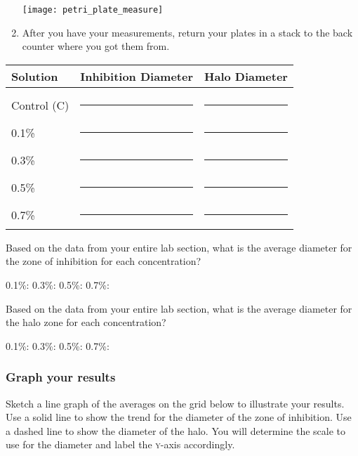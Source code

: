 \documentclass[12pt]{exam}
\begin{document}
\begin{questions}
\begin{enumerate}
		{\centering\texttt{[image: petri\_plate\_measure]}\par
		}

	\item After you have your measurements, return your plates in a stack to the back counter where you got them from.
	
\end{enumerate}

\begin{longtable}[c]{lcc}
	\toprule
		Solution	&	Inhibition Diameter	&	Halo Diameter \tabularnewline
	\midrule
		& & \tabularnewline[0.75em]
		Control (C)	& \rule{0.75in}{0.4pt} & \rule{0.75in}{0.4pt} \tabularnewline[2em]
		0.1\%	& \rule{0.75in}{0.4pt} & \rule{0.75in}{0.4pt} \tabularnewline[2em]
		0.3\%	& \rule{0.75in}{0.4pt} & \rule{0.75in}{0.4pt} \tabularnewline[2em]
		0.5\%	& \rule{0.75in}{0.4pt} & \rule{0.75in}{0.4pt} \tabularnewline[2em]
		0.7\%	& \rule{0.75in}{0.4pt} & \rule{0.75in}{0.4pt} \tabularnewline
	\bottomrule
\end{longtable}

\question
Based on the data from your entire lab section, what is the average diameter for the zone of inhibition for each concentration?

\vspace*{\baselineskip}

0.1\%: \hfill 0.3\%: \hfill 0.5\%: \hfill 0.7\%: \hfill \phantom{|}

\vspace{1\baselineskip}

\question
Based on the data from your entire lab section, what is the average diameter for the halo zone for each concentration?

\vspace*{\baselineskip}

0.1\%: \hfill 0.3\%: \hfill 0.5\%: \hfill 0.7\%: \hfill \phantom{|}

\vspace{1\baselineskip}


\subsubsection*{Graph your results}

Sketch a line graph of the averages on the grid below to illustrate your results. Use a solid line to show the trend for the diameter of the zone of inhibition. Use a dashed line to show the diameter of the halo. You will determine the scale to use for the diameter and label the \textsc{y}-axis accordingly.


\end{questions}
\end{document}
